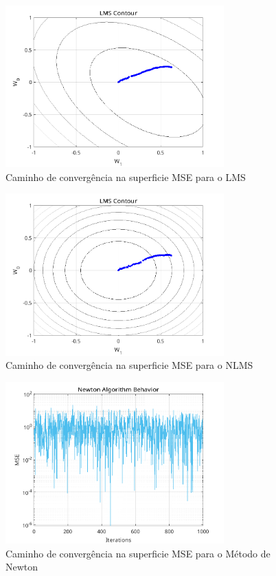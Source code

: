 \documentclass[a4paper,10pt]{article}
\begin{document}
\begin{enumerate}
				\begin{figure}[!ht]
					\centering
					\includegraphics[width=0.75\textwidth]{figs/lms_contour.png}
					\caption{Caminho de convergência na superficie MSE para o LMS}
					\label{fig:lms_contour}
				\end{figure}

				\begin{figure}[!ht]
					\centering
					\includegraphics[width=0.75\textwidth]{figs/nlms_contour.png}
					\caption{Caminho de convergência na superficie MSE para o NLMS}
					\label{fig:nlms_contour}
				\end{figure}

				\begin{figure}[!ht]
					\centering
					\includegraphics[width=0.75\textwidth]{figs/newton_mse.png}
					\caption{Caminho de convergência na superficie MSE para o Método de Newton}
					\label{fig:newton_mse}
				\end{figure}
				

\end{enumerate}
\end{document}
